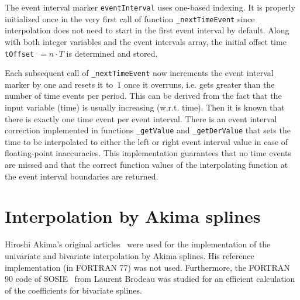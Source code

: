 \documentclass[11pt,a4paper,twocolumn]{article}
\begin{document}
The event interval marker \texttt{eventInterval} uses one-based indexing. It is properly initialized once in the very first call of function \texttt{\_next\-Time\-Event} since interpolation does not need to start in the first event interval by default. Along with both integer variables and the event intervals array, the initial offset time \texttt{tOffset}~$=n\cdot T$ is determined and stored.

Each subsequent call of \texttt{\_next\-Time\-Event} now increments the event interval marker by one and resets it to~$1$ once it overruns, i.e. gets greater than the number of time events per period. This can be derived from the fact that the input variable (time) is usually increasing (w.r.t. time). Then it is known that there is exactly one time event per event interval. There is an event interval correction implemented in functions \texttt{\_getValue} and \texttt{\_getDerValue} that sets the time to be interpolated to either the left or right event interval value in case of floating-point inaccuracies. This implementation guarantees that no time events are missed and that the correct function values of the interpolating function at the event interval boundaries are returned.

\section{Interpolation by Akima splines}
Hiroshi Akima's original articles~\cite{Akima:1970:NMI:321607.321609, Akima:1974:MBI:360767.360779} were used for the implementation of the univariate and bivariate interpolation by Akima splines. His reference implementation (in FORTRAN 77) was not used. Furthermore, the FORTRAN 90 code of SOSIE~\cite{www:sosie} from Laurent Brodeau was studied for an efficient calculation of the coefficients for bivariate splines.
\end{document}
